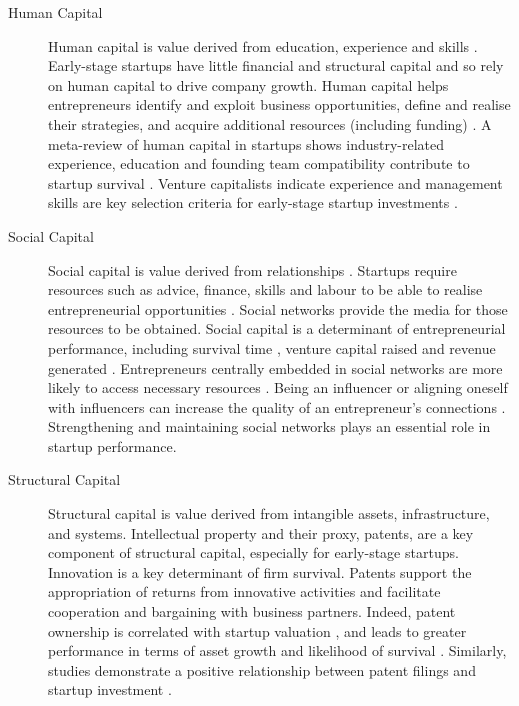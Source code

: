 \documentclass[../thesis/thesis.tex]{subfiles}
\begin{document}
\begin{refsection}
\begin{description}

\item[Human Capital]

Human capital is value derived from education, experience and skills \cite{gimmon2010}. Early-stage startups have little financial and structural capital and so rely on human capital to drive company growth. Human capital helps entrepreneurs identify and exploit business opportunities, define and realise their strategies, and acquire additional resources (including funding) \cite{ahlers2015}. A meta-review of human capital in startups shows industry-related experience, education and founding team compatibility contribute to startup survival \cite{gimmon2010}. Venture capitalists indicate experience and management skills are key selection criteria for early-stage startup investments \cite{gimmon2010}.

\item[Social Capital]

Social capital is value derived from relationships \cite{gedajlovic2013}. Startups require resources such as advice, finance, skills and labour to be able to realise entrepreneurial opportunities \cite{baum2004}. Social networks provide the media for those resources to be obtained. Social capital is a determinant of entrepreneurial performance, including survival time \cite{song2012}, venture capital raised \cite{gloor2013} and revenue generated \cite{stam2008}. Entrepreneurs centrally embedded in social networks are more likely to access necessary resources \cite{song2012}. Being an influencer or aligning oneself with influencers can increase the quality of an entrepreneur's connections \cite{gloor2013}. Strengthening and maintaining social networks plays an essential role in startup performance.

\item[Structural Capital]

Structural capital is value derived from intangible assets, infrastructure, and systems. Intellectual property and their proxy, patents, are a key component of structural capital, especially for early-stage startups. Innovation is a key determinant of firm survival. Patents support the appropriation of returns from innovative activities and facilitate cooperation and bargaining with business partners. Indeed, patent ownership is correlated with startup valuation \cite{hsu2008}, and leads to greater performance in terms of asset growth \cite{helmers2011} and likelihood of survival \cite{wagner2010}. Similarly, studies demonstrate a positive relationship between patent filings and startup investment \cite{hoenen2014}.


\end{description}
\end{refsection}
\end{document}
